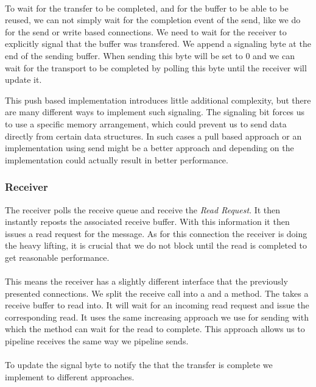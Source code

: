 \paragraph{} To wait for the transfer to be completed, and for the buffer to be able to be reused, we can not simply wait 
for the completion event of the send, like we do for the send or write based connections. We need to wait for the receiver 
to explicitly signal that the buffer was transfered. We append a signaling byte at the end of the sending buffer. 
When sending this byte will be set to 0 and we can wait for the transport to be completed by polling this byte until the 
receiver will update it.

This push based implementation introduces little additional complexity, but there are many different ways to implement such 
signaling. The signaling bit forces us to use a specific memory arrangement, which could prevent us to send data directly 
from certain data structures. In such cases a pull based approach or an implementation using send might be a better approach
and depending on the implementation could actually result in better performance.

\subsubsection{Receiver}
The receiver polls the receive queue and receive the \emph{Read Request}. It then instantly reposts the associated 
receive buffer. With this information it then issues a read request for the message. As for this connection the receiver is
doing the heavy lifting, it is crucial that we do not block until the read is completed to get reasonable performance. 

\paragraph{} This means the receiver has a slightly different interface that the previously presented connections. 
We split the receive call into a  and a  method. The  takes a receive buffer
to read into. It will wait for an incoming read request and issue the corresponding read. It uses the same increasing 
 approach we use for sending with which the  method can wait for the read to complete. This approach
allows us to pipeline receives the same way we pipeline sends.

\paragraph{} To update the signal byte to notify the that the transfer is complete we implement to different approaches.

